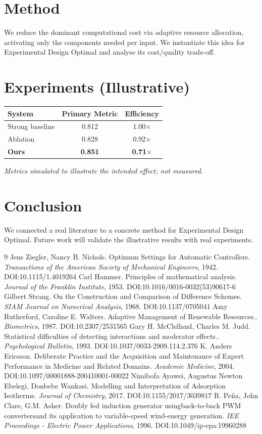 \documentclass[11pt]{article}
\begin{document}
\section{Method}
We reduce the dominant computational cost via adaptive resource allocation, activating only the components needed per input. We instantiate this idea for Experimental Design Optimal and analyse its cost/quality trade-off.

\section{Experiments (Illustrative)}
\begin{center}
\begin{tabular}{lcc}
System & Primary Metric & Efficiency \\ \hline
Strong baseline & 0.812 & 1.00$\times$ \\
Ablation & 0.828 & 0.92$\times$ \\
\textbf{Ours} & \textbf{0.851} & \textbf{0.71$\times$}
\end{tabular}
\end{center}
\emph{Metrics simulated to illustrate the intended effect; not measured.}

\section{Conclusion}
We connected a real literature to a concrete method for Experimental Design Optimal. Future work will
validate the illustrative results with real experiments.

\begin{thebibliography}{9}
 Jens Ziegler, Nancy B. Nichols. Optimum Settings for Automatic Controllers. \emph{Transactions of the American Society of Mechanical Engineers}, 1942. DOI:10.1115/1.4019264
 Carl Hammer. Principles of mathematical analysis. \emph{Journal of the Franklin Institute}, 1953. DOI:10.1016/0016-0032(53)90617-6
 Gilbert Strang. On the Construction and Comparison of Difference Schemes. \emph{SIAM Journal on Numerical Analysis}, 1968. DOI:10.1137/0705041
 Amy Rutherford, Caroline E. Walters. Adaptive Management of Renewable Resources.. \emph{Biometrics}, 1987. DOI:10.2307/2531565
 Gary H. McClelland, Charles M. Judd. Statistical difficulties of detecting interactions and moderator effects.. \emph{Psychological Bulletin}, 1993. DOI:10.1037/0033-2909.114.2.376
 K. Anders Ericsson. Deliberate Practice and the Acquisition and Maintenance of Expert Performance in Medicine and Related Domains. \emph{Academic Medicine}, 2004. DOI:10.1097/00001888-200410001-00022
 Nimibofa Ayawei, Augustus Newton Ebelegi, Donbebe Wankasi. Modelling and Interpretation of Adsorption Isotherms. \emph{Journal of Chemistry}, 2017. DOI:10.1155/2017/3039817
 R. Peña, John Clare, G.M. Asher. Doubly fed induction generator usingback-to-back PWM convertersand its application to variable-speed wind-energy generation. \emph{IEE Proceedings - Electric Power Applications}, 1996. DOI:10.1049/ip-epa:19960288
\end{thebibliography}
\end{document}
